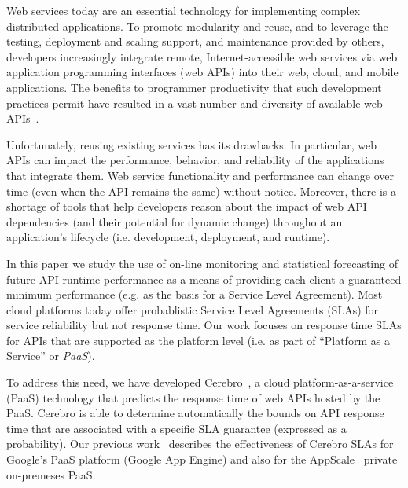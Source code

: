 Web services today are an essential technology for implementing
complex distributed applications.  To promote modularity and reuse, 
and to leverage the testing, deployment and scaling support, and maintenance 
provided by others, developers increasingly integrate remote, Internet-accessible web services 
via web application programming interfaces (web APIs)
into their web, cloud, and mobile applications.  
The benefits to programmer productivity that such development practices
permit have resulted in a vast number and diversity of available web APIs~\cite{pweb}.

Unfortunately, reusing existing services has its drawbacks. In particular, 
web APIs can impact the performance, behavior, and reliability of the applications
that integrate them.  Web service functionality and performance can change over time 
(even when the API remains the same) without notice.
Moreover, there is a shortage of tools that help developers 
reason about the impact of web API dependencies (and their potential for
dynamic change)
throughout an application's 
lifecycle (i.e. development, deployment, and runtime).  

In this paper we study the use of on-line monitoring and statistical
forecasting of future API runtime performance as a means of providing each
client a guaranteed minimum performance (e.g. as the basis for a Service Level
Agreement).  Most cloud platforms today offer probablistic
Service Level Agreements (SLAs) for service reliability but not response time. 
Our work focuses on response time SLAs for APIs that are supported as the
platform level (i.e. as part of ``Platform as a Service'' or \textit{PaaS}).


To address this need, we have developed Cerebro~\cite{cerebro-soccsub15},
a cloud platform-as-a-service (PaaS) technology that
predicts the response time of web APIs hosted by the PaaS.  Cerebro is able to
determine automatically the bounds on API response time that are 
associated with a specific SLA guarantee (expressed as a probability).
Our previous work~\cite{cerebro-soccsub15} describes the effectiveness of
Cerebro SLAs for Google's PaaS platform (Google
App Engine) and also for the AppScale~\cite{6488671} private on-premeses PaaS.  

